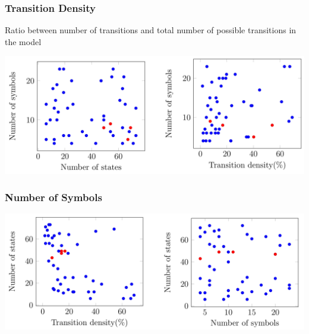 \begin{frame}
	\frametitle{Transition Density}
	Ratio between number of transitions and total number of possible transitions in the model
	\begin{centering}
		\includegraphics[width=1\textwidth]{images/transition.png}
	\end{centering}
\end{frame}

\begin{frame}
	\frametitle{Number of Symbols}
	\begin{centering}
		\includegraphics[width=1\textwidth]{images/symbols.png}
	\end{centering}
\end{frame}

